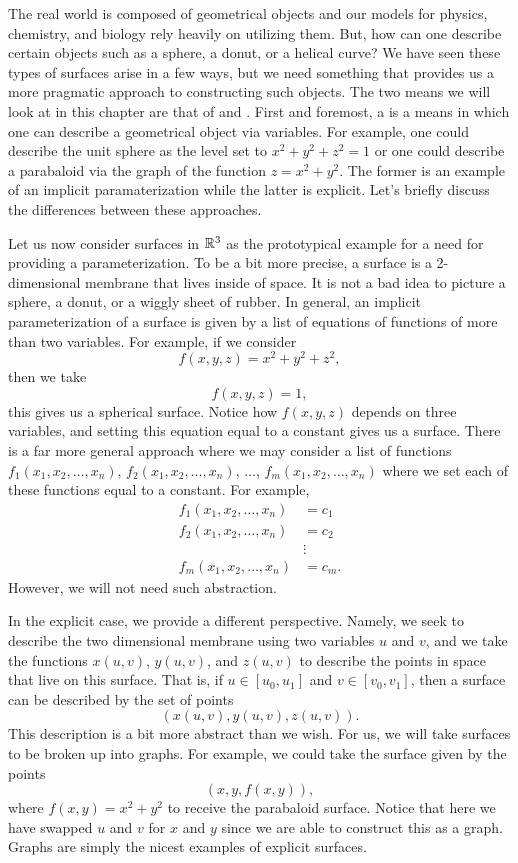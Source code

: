     The real world is composed of geometrical objects and our models for physics, chemistry, and biology rely heavily on utilizing them.  But, how can one describe certain objects such as a sphere, a donut, or a helical curve?  We have seen these types of surfaces arise in a few ways, but we need something that provides us a more pragmatic approach to constructing such objects. The two means we will look at in this chapter are that of  and . First and foremost, a  is a means in which one can describe a geometrical object via variables.  For example, one could describe the unit sphere as the level set to $x^2+y^2+z^2=1$ or one could describe a parabaloid via the graph of the function $z=x^2+y^2$. The former is an example of an implicit paramaterization while the latter is explicit. Let's briefly discuss the differences between these approaches.

    Let us now consider surfaces in $\mathbb{R}^3$ as the prototypical example for a need for providing a parameterization.  To be a bit more precise, a surface is a 2-dimensional membrane that lives inside of space.  It is not a bad idea to picture a sphere, a donut, or a wiggly sheet of rubber. In general, an implicit parameterization of a surface is given by a list of equations of functions of more than two variables.  For example, if we consider
    \[
    f(x,y,z) = x^2+y^2+z^2,
    \]
    then we take
    \[
    f(x,y,z) = 1,
    \]
    this gives us a spherical surface.  Notice how $f(x,y,z)$ depends on three variables, and setting this equation equal to a constant gives us a surface.  There is a far more general approach where we may consider a list of functions $f_1(x_1,x_2,\dots,x_n)$, $f_2(x_1,x_2,\dots,x_n)$, $\dots$, $f_m(x_1,x_2,\dots,x_n)$ where we set each of these functions equal to a constant. For example,
    \begin{align*}
        f_1(x_1,x_2,\dots,x_n) &= c_1\\
        f_2(x_1,x_2,\dots,x_n) &= c_2\\
        &\vdots\\
        f_m(x_1,x_2,\dots,x_n) &= c_m.
    \end{align*}
    However, we will not need such abstraction.

    In the explicit case, we provide a different perspective.  Namely, we seek to describe the two dimensional membrane using two variables $u$ and $v$, and we take the functions $x(u,v)$, $y(u,v)$, and $z(u,v)$ to describe the points in space that live on this surface.  That is, if $u\in [u_0,u_1]$ and $v\in [v_0,v_1]$, then a surface can be described by the set of points
    \[
    (x(u,v),y(u,v),z(u,v)).
    \]
    This description is a bit more abstract than we wish.  For us, we will take surfaces to be broken up into graphs.  For example, we could take the surface given by the points
    \[
    (x,y,f(x,y)),
    \]
    where $f(x,y)=x^2+y^2$ to receive the parabaloid surface.  Notice that here we have swapped $u$ and $v$ for $x$ and $y$ since we are able to construct this as a graph. Graphs are simply the nicest examples of explicit surfaces.


